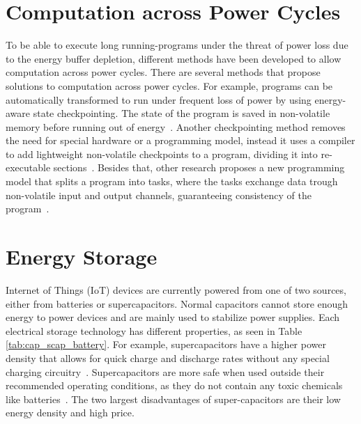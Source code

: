 \section{Computation across Power Cycles}
\label{sec:rw_comp_pc} 

To be able to execute long running-programs under the threat of power loss due to the energy buffer depletion, different methods have been developed to allow computation across power cycles.
There are several methods that propose solutions to computation across power cycles.
For example, programs can be automatically transformed to run under frequent loss of power by using energy-aware state checkpointing.
The state of the program is saved in non-volatile memory before running out of energy~\cite{ransford_asplos_2011}.
Another checkpointing method removes the need for special hardware or a programming model, instead it uses a compiler to add lightweight non-volatile checkpoints to a program, dividing it into re-executable sections~\cite{vanderwoude_osdi_2016}.
Besides that, other research proposes a new programming model that splits a program into tasks, where the tasks exchange data trough non-volatile input and output channels, guaranteeing consistency of the program~\cite{colin_oopsla_2017}.


\section{Energy Storage}
\label{sec:rw_energy_storage}




Internet of Things (IoT) devices are currently powered from one of two sources, either from batteries or supercapacitors.
Normal capacitors cannot store enough energy to power devices and are mainly used to stabilize power supplies.
Each electrical storage technology has different properties, as seen in Table \ref{tab:cap_scap_battery}.
For example, supercapacitors have a higher power density that allows for quick charge and discharge rates without any special charging circuitry~\cite{prasad_comst_2014}.
Supercapacitors are more safe when used outside their recommended operating conditions, as they do not contain any toxic chemicals like batteries~\cite{maxwell_overview_2017}.
The two largest disadvantages of super-capacitors are their low energy density and high price.

